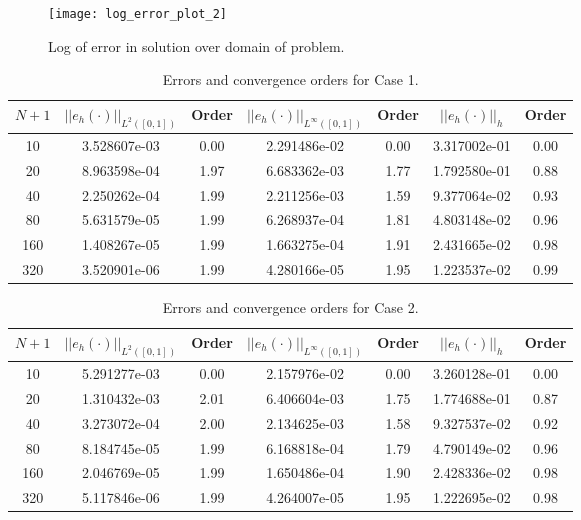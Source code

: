 \documentclass[a4paper, 12pt]{article}
\begin{document}
\begin{figure}[H]
  \centering
  \texttt{[image: log\_error\_plot\_2]}
  \caption{ Log of error in solution over domain of problem.}
  \label{fig:logError2}
\end{figure}

\begin{table}[!ht]
\caption{Errors and convergence orders for Case 1.}
\vspace{0.1in}
\centering
\begin{tabular}{|c|c|c| c| c| c| c|}
\hline
 $N+1$&  $||e_h(\cdot)||_{L^2([0,1])}$ & Order  & $||e_h(\cdot)||_{L^\infty([0,1])}$ & Order& $||e_h(\cdot)||_h$& Order \\
 \hline
     10  &  3.528607e-03 & 0.00 & 2.291486e-02 & 0.00 & 3.317002e-01 & 0.00\\
     20  &  8.963598e-04 & 1.97 & 6.683362e-03 & 1.77 & 1.792580e-01 & 0.88\\
     40  &  2.250262e-04 & 1.99 & 2.211256e-03 & 1.59 & 9.377064e-02 & 0.93\\
     80  &  5.631579e-05 & 1.99 & 6.268937e-04 & 1.81 & 4.803148e-02 & 0.96\\
     160 &  1.408267e-05 & 1.99 & 1.663275e-04 & 1.91 & 2.431665e-02 & 0.98\\
     320 &  3.520901e-06 & 1.99 & 4.280166e-05 & 1.95 & 1.223537e-02 & 0.99\\
\hline
\end{tabular}
\label{tab:C1}
\end{table}

\begin{table}[!ht]
\caption{Errors and convergence orders for Case 2.}
\vspace{0.1in}
\centering
\begin{tabular}{|c|c|c| c| c| c| c|}
\hline
 $N+1$&  $||e_h(\cdot)||_{L^2([0,1])}$ & Order  & $||e_h(\cdot)||_{L^\infty([0,1])}$ & Order& $||e_h(\cdot)||_h$& Order \\
 \hline
     10  & 5.291277e-03 & 0.00 & 2.157976e-02 & 0.00 & 3.260128e-01 & 0.00\\
     20  & 1.310432e-03 & 2.01 & 6.406604e-03 & 1.75 & 1.774688e-01 & 0.87\\
     40  & 3.273072e-04 & 2.00 & 2.134625e-03 & 1.58 & 9.327537e-02 & 0.92\\
     80  & 8.184745e-05 & 1.99 & 6.168818e-04 & 1.79 & 4.790149e-02 & 0.96\\
     160 & 2.046769e-05 & 1.99 & 1.650486e-04 & 1.90 & 2.428336e-02 & 0.98\\
     320 & 5.117846e-06 & 1.99 & 4.264007e-05 & 1.95 & 1.222695e-02 & 0.98\\
\hline
\end{tabular}
\label{tab:C2}
\end{table}
\end{document}
